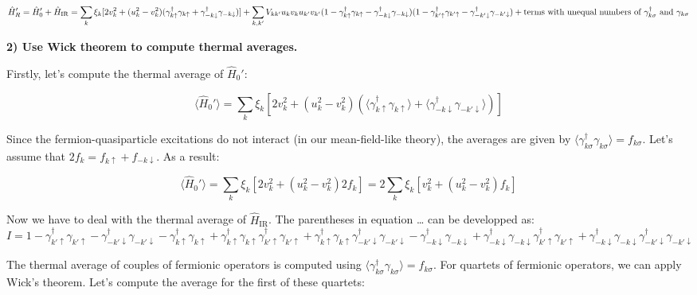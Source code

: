 \[ \hat{H}'_R = \hat{H}'_0 + \hat{H}_{\textrm{IR}} \\ = \sum_k \xi_k [2 v_k^2 + (u_k^2 - v_k^2)(\gamma^\dagger_{k\uparrow}\gamma_{k\uparrow}+\gamma^\dagger_{-k\downarrow}\gamma_{-k\downarrow})] + \sum_{k,k'} V_{k k'} u_k v_k u_{k'}v_{k'}(1 - \gamma^\dagger_{k\uparrow}\gamma_{k\uparrow}-\gamma^\dagger_{-k\downarrow}\gamma_{-k\downarrow})(1 - \gamma^\dagger_{k'\uparrow}\gamma_{k'\uparrow}-\gamma^\dagger_{-k'\downarrow}\gamma_{-k'\downarrow})+ \textrm{terms with unequal numbers of $\gamma^\dagger_{k\sigma}$ and $\gamma_{k\sigma}$}\]

\textbf{2) Use Wick theorem to compute thermal averages.}

Firstly, let's compute the thermal average of \(\hat{H}_0'\):

\[\langle \hat{H}_0' \rangle = \sum_k \xi_k [2 v_k^2 + (u_k^2 - v_k^2)(\langle \gamma_{k\uparrow}^\dagger \gamma_{k\uparrow}\rangle + \langle \gamma_{-k\downarrow}^\dagger \gamma_{-k'\downarrow}\rangle)]\]

Since the fermion-quasiparticle excitations do not interact (in our
mean-field-like theory), the averages are given by
\(\langle \gamma^\dagger_{k\sigma}\gamma_{k\sigma} \rangle = f_{k\sigma}\).
Let's assume that \(2 f_k = f_{k\uparrow}+f_{-k\downarrow}\). As a
result:

\[ \langle \hat{H}_0' \rangle = \sum_k \xi_k [2 v_k^2 + (u_k^2 - v_k^2)2 f_k] = 2 \sum_k \xi_k [v_k^2 + (u_k^2 - v_k^2)f_k]\]

Now we have to deal with the thermal average of
\(\hat{H}_{\textrm{IR}}\). The parentheses in equation \ldots{} can be
developped as:
\(I = 1 - \gamma_{k'\uparrow}^\dagger \gamma_{k'\uparrow} - \gamma_{-k'\downarrow}^\dagger \gamma_{-k'\downarrow} - \gamma_{k\uparrow}^\dagger \gamma_{k\uparrow} + \gamma_{k\uparrow}^\dagger\gamma_{k\uparrow}\gamma_{k'\uparrow}^\dagger\gamma_{k'\uparrow} + \gamma_{k\uparrow}^\dagger\gamma_{k\uparrow}\gamma_{-k'\downarrow}^\dagger\gamma_{-k'\downarrow} - \gamma_{-k\downarrow}^\dagger\gamma_{-k\downarrow}+\gamma_{-k\downarrow}^\dagger\gamma_{-k\downarrow}\gamma_{k'\uparrow}^\dagger\gamma_{k'\uparrow}+\gamma_{-k\downarrow}^\dagger\gamma_{-k\downarrow}\gamma_{-k'\downarrow}^\dagger\gamma_{-k'\downarrow}\)

The thermal average of couples of fermionic operators is computed using
\(\langle \gamma^\dagger_{k\sigma}\gamma_{k\sigma} \rangle = f_{k\sigma}\).
For quartets of fermionic operators, we can apply Wick's theorem. Let's
compute the average for the first of these quartets:

